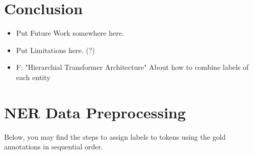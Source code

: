 \documentclass{report}
\theoremstyle{definition}
\theoremstyle{remark}
\begin{document}
\chapter{Conclusion}
\begin{itemize}
    \item Put Future Work somewhere here.
    \item Put Limitations here. (?)
    \item F: "Hierarchial Transformer Architecture" About how to combine labels of each entity 
\end{itemize}








\appendix
\newpage
\chapter{NER Data Preprocessing}
\label{app:NERPrepro}
 Below, you may find the steps to assign labels to tokens using the gold annotations in sequential order.
\end{document}
